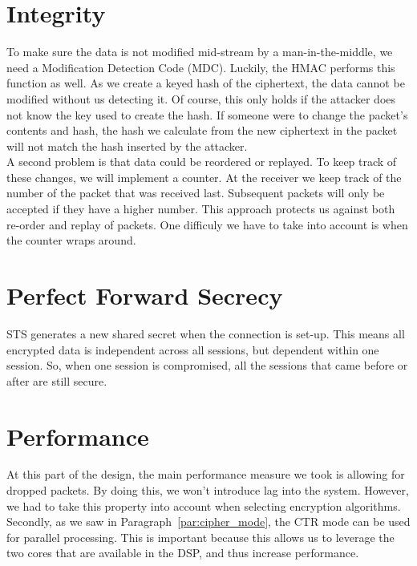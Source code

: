 \documentclass[a4paper]{article}
\begin{document}
\section{Integrity}

To make sure the data is not modified mid-stream by a man-in-the-middle, we need a Modification Detection Code (MDC). Luckily, the HMAC performs this function as well. As we create a keyed hash of the ciphertext, the data cannot be modified without us detecting it. Of course, this only holds if the attacker does not know the key used to create the hash. If someone were to change the packet's contents and hash, the hash we calculate from the new ciphertext in the packet will not match the hash inserted by the attacker.\\

A second problem is that data could be reordered or replayed. To keep track of these changes, we will implement a counter. At the receiver we keep track of the number of the packet that was received last. Subsequent packets will only be accepted if they have a higher number. This approach protects us against both re-order and replay of packets. One difficuly we have to take into account is when the counter wraps around.

\section{Perfect Forward Secrecy}

STS generates a new shared secret when the connection is set-up. This means all encrypted data is independent across all sessions, but dependent within one session. So, when one session is compromised, all the sessions that came before or after are still secure.

\section{Performance}

At this part of the design, the main performance measure we took is allowing for dropped packets. By doing this, we won't introduce lag into the system. However, we had to take this property into account when selecting encryption algorithms.\\

Secondly, as we saw in Paragraph~\ref{par:cipher_mode}, the CTR mode can be used for parallel processing. This is important because this allows us to leverage the two cores that are available in the DSP, and thus increase performance.
\end{document}
